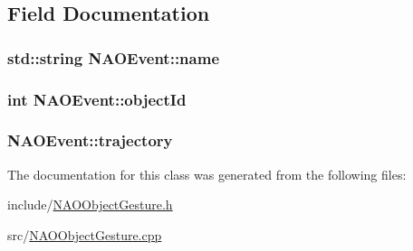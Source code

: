\subsection{\-Field \-Documentation}
\hypertarget{classNAOEvent_af65dc0b2d023e857c39b0c185963763c}{
\subsubsection[{name}]{\setlength{\rightskip}{0pt plus 5cm}std\-::string {\bf \-N\-A\-O\-Event\-::name}}}\label{classNAOEvent_af65dc0b2d023e857c39b0c185963763c}
\hypertarget{classNAOEvent_a8a63b16157fd1c205a382bff04d32e26}{
\subsubsection[{object\-Id}]{\setlength{\rightskip}{0pt plus 5cm}int {\bf \-N\-A\-O\-Event\-::object\-Id}}}\label{classNAOEvent_a8a63b16157fd1c205a382bff04d32e26}
\hypertarget{classNAOEvent_a308aec441df98356019a18d5e977cf11}{
\subsubsection[{trajectory}]{ {\bf \-N\-A\-O\-Event\-::trajectory}}}\label{classNAOEvent_a308aec441df98356019a18d5e977cf11}


\-The documentation for this class was generated from the following files\-:\begin{DoxyCompactItemize}
\item 
include/\hyperlink{NAOObjectGesture_8h}{\-N\-A\-O\-Object\-Gesture.\-h}\item 
src/\hyperlink{NAOObjectGesture_8cpp}{\-N\-A\-O\-Object\-Gesture.\-cpp}\end{DoxyCompactItemize}
